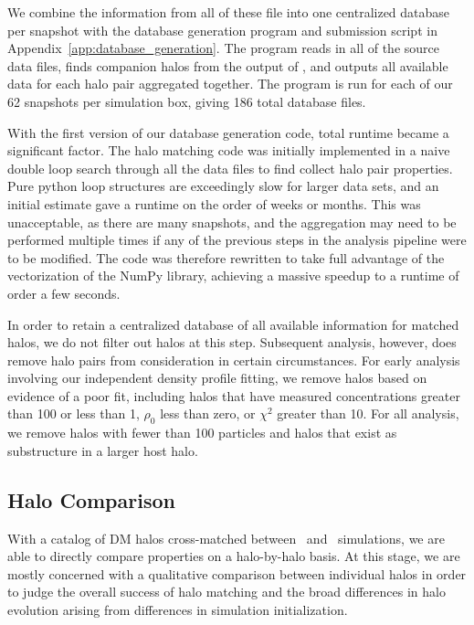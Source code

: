 We combine the information from all of these file into one centralized database per snapshot with the database generation program and submission script in Appendix~\ref{app:database_generation}.  The program reads in all of the source data files, finds companion halos from the output of \crossmatch, and outputs all available data for each halo pair aggregated together.  The program is run for each of our 62 snapshots per simulation box, giving 186 total database files.

With the first version of our database generation code, total runtime became a significant factor.  The halo matching code was initially implemented in a naive double loop search through all the data files to find collect halo pair properties.  Pure python loop structures are exceedingly slow for larger data sets, and an initial estimate gave a runtime on the order of weeks or months.  This was unacceptable, as there are many snapshots, and the aggregation may need to be performed multiple times if any of the previous steps in the analysis pipeline were to be modified.  The code was therefore rewritten to take full advantage of the vectorization of the NumPy library, achieving a massive speedup to a runtime of order a few seconds.

In order to retain a centralized database of all available information for matched halos, we do not filter out halos at this step.  Subsequent analysis, however, does remove halo pairs from consideration in certain circumstances.  For early analysis involving our independent density profile fitting, we remove halos based on evidence of a poor fit, including halos that have measured concentrations greater than 100 or less than 1, $\rho_{0}$ less than zero, or $\chi^{2}$ greater than 10.  For all analysis, we remove halos with fewer than 100 particles and halos that exist as substructure in a larger host halo.




\subsection{Halo Comparison}
\label{subsec:analysis--halo_comparison}


With a catalog of DM halos cross-matched between \lpt\ and \za\ simulations, we are able to directly compare properties on a halo-by-halo basis.  At this stage, we are mostly concerned with a qualitative comparison between individual halos in order to judge the overall success of halo matching and the broad differences in halo evolution arising from differences in simulation initialization.



